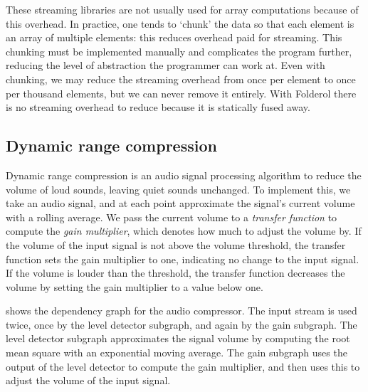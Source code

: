 These streaming libraries are not usually used for array computations because of this overhead.
In practice, one tends to `chunk' the data so that each element is an array of multiple elements: this reduces overhead paid for streaming.
This chunking must be implemented manually and complicates the program further, reducing the level of abstraction the programmer can work at.
Even with chunking, we may reduce the streaming overhead from once per element to once per thousand elements, but we can never remove it entirely.
With Folderol there is no streaming overhead to reduce because it is statically fused away.


\subsection{Dynamic range compression}
Dynamic range compression is an audio signal processing algorithm to reduce the volume of loud sounds, leaving quiet sounds unchanged.
To implement this, we take an audio signal, and at each point approximate the signal's current volume with a rolling average.
We pass the current volume to a \emph{transfer function} to compute the \emph{gain multiplier}, which denotes how much to adjust the volume by.
If the volume of the input signal is not above the volume threshold, the transfer function sets the gain multiplier to one, indicating no change to the input signal.
If the volume is louder than the threshold, the transfer function decreases the volume by setting the gain multiplier to a value below one.

 shows the dependency graph for the audio compressor.
The input stream is used twice, once by the level detector subgraph, and again by the gain subgraph.
The level detector subgraph approximates the signal volume by computing the root mean square with an exponential moving average.
The gain subgraph uses the output of the level detector to compute the gain multiplier, and then uses this to adjust the volume of the input signal.

